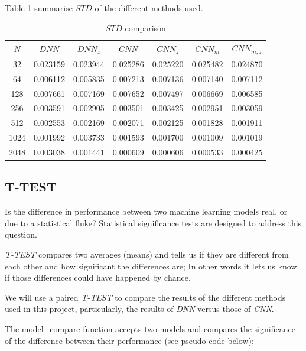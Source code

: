 \documentclass[a4paper, 12pt]{report}
\begin{document}
Table \ref{table:STD-comparison} summarise $STD$ of the different methods used.
\begin{table}[!htb]
    \sffamily
    \scriptsize
    \centering
    \begin{tabular}{||c c c c c c c||} 
        \hline
        $N$ & $DNN$ & $DNN_z$ & $CNN$ & $CNN_z$ & $CNN_m$ & $CNN_{m,z}$ \\ [0.5ex] 
        \hline\hline
    	32 & 0.023159 & 0.023944 & 0.025286 & 0.025220 & 0.025482 & 0.024870 \\
    	\hline
    	64 & 0.006112 & 0.005835 & 0.007213 & 0.007136 & 0.007140 & 0.007112 \\
    	\hline
    	128 & 0.007661 & 0.007169 & 0.007652 & 0.007497 & 0.006669 & 0.006585 \\
    	\hline
    	256 & 0.003591 & 0.002905 & 0.003501 & 0.003425 & 0.002951 & 0.003059 \\
    	\hline
    	512 & 0.002553 & 0.002169 & 0.002071 & 0.002125 & 0.001828 & 0.001911 \\
    	\hline
    	1024 & 0.001992 & 0.003733 & 0.001593 & 0.001700 & 0.001009 & 0.001019 \\
    	\hline
    	2048 & 0.003038 & 0.001441 & 0.000609 & 0.000606 & 0.000533 & 0.000425 \\
	\hline
    \end{tabular}
    \caption{$STD$ comparison}
    \label{table:STD-comparison}
\end{table}

\newpage
\subsection{T-TEST}
Is the difference in performance between two machine learning models real, or due to a statistical fluke? Statistical significance tests are designed to address this question.

\textit{T-TEST} compares two averages (means) and tells us if they are different from each other and how significant the differences are; In other words it lets us know if those differences could have happened by chance.

We will use a paired \textit{T-TEST} to compare the results of the different methods used in this project, particularly, the results of \textit{DNN} versus those of \textit{CNN}.

The model\_compare function accepts two models and compares the significance of the difference between their performance (see pseudo code below):
\end{document}
